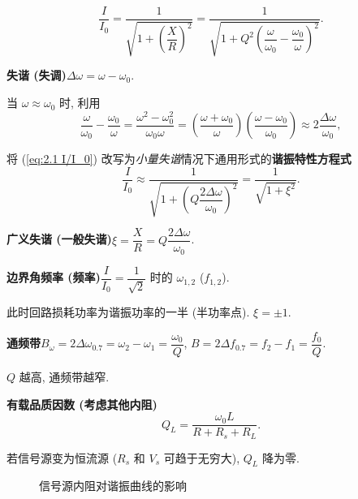 \begin{equation} \label{eq:2.1 I/I_0}
    \frac{I}{I_0}=\frac{1}{\sqrt{1+\left(\dfrac{X}{R}\right)^2}}=\frac{1}{\sqrt{1+Q^2\left(\dfrac{\omega}{\omega_0}-\dfrac{\omega_0}{\omega}\right)^2}}.
\end{equation}

\textbf{失谐 (失调)}\quad $\Delta\omega=\omega-\omega_0$.

当 $\omega\approx\omega_0$ 时, 利用
\begin{equation*}
    \frac{\omega}{\omega_0}-\frac{\omega_0}{\omega}=\frac{\omega^2-\omega_0^2}{\omega_0\omega}=\left(\frac{\omega+\omega_0}{\omega}\right)\left(\frac{\omega-\omega_0}{\omega_0}\right)\approx 2\frac{\Delta\omega}{\omega_0},
\end{equation*}

\noindent 将 (\ref{eq:2.1 I/I_0}) 改写为\textit{小量失谐}情况下通用形式的\textbf{谐振特性方程式}
\begin{equation} \label{eq:2.1 I/I_0 xi}
    \frac{I}{I_0}\approx\frac{1}{\sqrt{1+\left(Q\dfrac{2\Delta\omega}{\omega_0}\right)^2}}=\frac{1}{\sqrt{1+\xi^2}}.
\end{equation}

\textbf{广义失谐 (一般失谐)}\quad $\xi=\dfrac{X}{R}=Q\dfrac{2\Delta\omega}{\omega_0}$.

\textbf{边界角频率 (频率)}\quad $\dfrac{I}{I_0}=\dfrac{1}{\sqrt{2}}$ 时的 $\omega_{1,2}$ ($f_{1,2}$).

此时回路损耗功率为谐振功率的一半 (半功率点). $\xi=\pm 1$.

\textbf{通频带}\quad $B_\omega=2\Delta\omega_{0.7}=\omega_2-\omega_1=\dfrac{\omega_0}{Q}$, $B=2\Delta f_{0.7}=f_2-f_1=\dfrac{f_0}{Q}$.

$Q$ 越高, 通频带越窄.

\textbf{有载品质因数 (考虑其他内阻)}
\begin{equation}
    Q_L=\frac{\omega_0L}{R+R_s+R_L}.
\end{equation}

若信号源变为恒流源 ($R_s$ 和 $V_s$ 可趋于无穷大), $Q_L$ 降为零.

\begin{figure}[H]
    \centering
    \caption{信号源内阻对谐振曲线的影响}
\end{figure}

